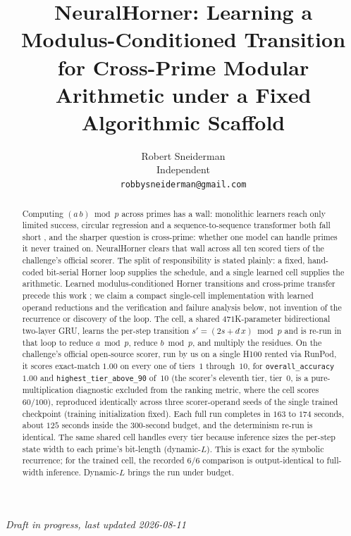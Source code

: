 \documentclass[11pt]{article}
\title{NeuralHorner: Learning a Modulus-Conditioned Transition for
Cross-Prime Modular Arithmetic under a Fixed Algorithmic Scaffold}
\author{Robert Sneiderman \\ Independent \\ \texttt{robbysneiderman@gmail.com}}
\date{}
\begin{document}
\maketitle

\begin{center}
\textit{Draft in progress, last updated 2026-08-11}
\end{center}

\begin{abstract}
Computing $(a\,b)\bmod p$ across primes has a wall: monolithic learners reach
only limited success, circular regression and a sequence-to-sequence transformer
both fall short \citep{lauter2024modular}, and the sharper question is
cross-prime: whether one model can handle primes it never trained on. NeuralHorner clears that wall across all ten scored tiers of the challenge's
official scorer. The split of responsibility is stated plainly: a fixed,
hand-coded bit-serial Horner loop supplies the schedule, and a single learned cell
supplies the arithmetic. Learned modulus-conditioned Horner transitions and
cross-prime transfer precede this work \citep{xllent2026horner}; we claim a compact
single-cell implementation with learned operand reductions and the verification
and failure analysis below, not invention of the recurrence or discovery of the loop. The cell, a shared
$471$K-parameter bidirectional two-layer GRU, learns the per-step transition
$s' = (2s + d\,x)\bmod p$ and is re-run in that loop to reduce $a\bmod p$, reduce
$b\bmod p$, and multiply the residues. On the challenge's official open-source scorer, run by us
on a single H100 rented via RunPod, it scores exact-match $1.00$ on every one of tiers~$1$
through~$10$, for \texttt{overall\_accuracy} $1.00$ and
\texttt{highest\_tier\_above\_90} of~$10$ (the scorer's eleventh tier, tier~$0$, is a
pure-multiplication diagnostic excluded from the ranking metric, where the cell scores
$60/100$), reproduced identically across three
scorer-operand seeds of the single trained checkpoint (training initialization fixed). Each full run completes in $163$ to $174$ seconds, about
$125$ seconds inside the $300$-second budget, and the determinism re-run is
identical. The same shared cell handles every tier because inference sizes the
per-step state width to each prime's bit-length (dynamic-$L$). This is exact for
the symbolic recurrence; for the trained cell, the recorded $6/6$ comparison is
output-identical to full-width inference. Dynamic-$L$ brings the run under budget.


\end{abstract}
\end{document}
